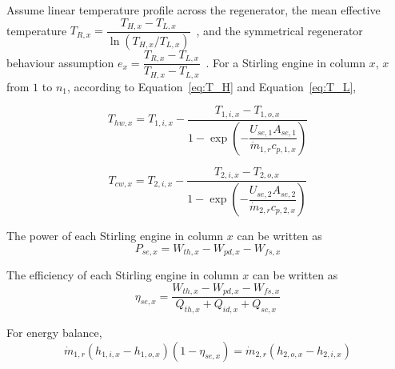 Assume linear temperature profile across the regenerator, the mean effective temperature $T_{R,x}=\dfrac{T_{H,x}-T_{L,x}}{\ln(T_{H,x}/T_{L,x})}$~\cite{Der2007,Cavazzuti2012}, and the symmetrical regenerator behaviour assumption $e_{x}=\dfrac{T_{R,x}-T_{L,x}}{T_{H,x}-T_{L,x}}$~\cite{Formosa2010,Juhasz2010}. For a Stirling engine in column $x$, $x$ from $1$ to $n_1$, according to Equation~\ref{eq:T_H} and Equation~\ref{eq:T_L},

\begin{equation}
	T_{hw,x}=T_{1,i,x}-\dfrac{T_{1,i,x}-T_{1,o,x}}{1-\exp(-\dfrac{U_{se,1}A_{se,1}}{\dot{m}_{1,r}c_{p,1,x}})}\label{eq:T_H_x}
\end{equation}


\begin{equation}
	T_{cw,x}=T_{2,i,x}-\dfrac{T_{2,i,x}-T_{2,o,x}}{1-\exp(-\dfrac{U_{se,2}A_{se,2}}{\dot{m}_{2,r}c_{p,2,x}})}\label{eq:T_L_x}
\end{equation}

The power of each Stirling engine in column $x$ can be written as 
\begin{equation}
  P_{se,x} = W_{th,x}-W_{pd,x}-W_{fs,x}\end{equation}

The efficiency of each Stirling engine in column $x$ can be written as 
\begin{equation}
  \eta_{se,x} = \dfrac{W_{th,x}-W_{pd,x}-W_{fs,x}}{Q_{th,x}+Q_{id,x}+Q_{sc,x}}
\end{equation}



For energy balance,
\begin{equation}
	\dot{m}_{1,r}(h_{1,i,x}-h_{1,o,x})(1-\eta_{se,x})=\dot{m}_{2,r}(h_{2,o,x}-h_{2,i,x})
\end{equation}


